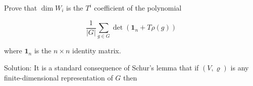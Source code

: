 \documentclass[10pt]{article}
\begin{document}
Prove that $\operatorname{dim} W_{i}$ is the $T^{i}$ coefficient of the polynomial

$$
\frac{1}{|G|} \sum_{g \in G} \operatorname{det}\left(\mathbf{1}_{n}+T \rho(g)\right)
$$

where $\mathbf{1}_{n}$ is the $n \times n$ identity matrix.

Solution: It is a standard consequence of Schur's lemma that if $(V, \varrho)$ is any finite-dimensional representation of $G$ then
\end{document}
